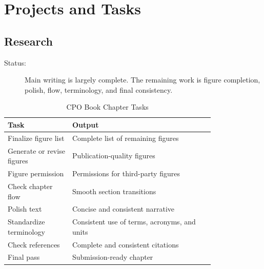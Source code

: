 \documentclass[custom, sidenote, final]{cls/oneproposal}
\begin{document}
\section{Projects and Tasks}

\subsection{Research}

\label{wi:cpo}

\begin{description}
    \item[Status:] Main writing is largely complete. The remaining work is figure completion, polish, flow, terminology, and final consistency.
\end{description}

\begin{table}[htbp]
    \centering
    \footnotesize
    \caption{CPO Book Chapter Tasks}\label{tab:cpo-tasks}
    \begin{tabular}{m{0.25\linewidth} p{0.55\linewidth}}
        \toprule
        \textbf{Task}              & \textbf{Output}                              \\
        \midrule
        Finalize figure list       & Complete list of remaining figures           \\
        \midrule
        Generate or revise figures & Publication-quality figures                  \\
        \midrule
        Figure permission          & Permissions for third-party figures          \\
        \midrule
        Check chapter flow         & Smooth section transitions                   \\
        \midrule
        Polish text                & Concise and consistent narrative             \\
        \midrule
        Standardize terminology    & Consistent use of terms, acronyms, and units \\
        \midrule
        Check references           & Complete and consistent citations            \\
        \midrule
        Final pass                 & Submission-ready chapter                     \\
        \bottomrule
    \end{tabular}
\end{table}
\end{document}
